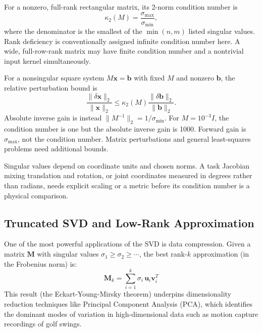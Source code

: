 For a nonzero, full-rank rectangular matrix, its 2-norm condition number is
\[
\kappa_2(M)=\frac{\sigma_{\max}}{\sigma_{\min}},
\]
where the denominator is the smallest of the $\min(n,m)$ listed singular values. Rank deficiency is conventionally assigned infinite condition number here. A wide, full-row-rank matrix may have finite condition number and a nontrivial input kernel simultaneously.

For a nonsingular square system $M\mathbf x=\mathbf b$ with fixed $M$ and nonzero $\mathbf b$, the relative perturbation bound is
\[
\frac{\|\delta\mathbf x\|_2}{\|\mathbf x\|_2}
\le \kappa_2(M)\frac{\|\delta\mathbf b\|_2}{\|\mathbf b\|_2}.
\]
Absolute inverse gain is instead $\|M^{-1}\|_2=1/\sigma_{\min}$. For $M=10^{-3}I$, the condition number is one but the absolute inverse gain is 1000. Forward gain is $\sigma_{\max}$, not the condition number. Matrix perturbations and general least-squares problems need additional bounds.

Singular values depend on coordinate units and chosen norms. A task Jacobian mixing translation and rotation, or joint coordinates measured in degrees rather than radians, needs explicit scaling or a metric before its condition number is a physical comparison.

\subsection{Truncated SVD and Low-Rank Approximation}

One of the most powerful applications of the SVD is data compression. Given a matrix $\mathbf{M}$ with singular values $\sigma_1 \geq \sigma_2 \geq \cdots$, the best rank-$k$ approximation (in the Frobenius norm) is:
\begin{equation}
    \mathbf{M}_k = \sum_{i=1}^k \sigma_i \, \mathbf{u}_i \mathbf{v}_i^T
\end{equation}
This result (the Eckart-Young-Mirsky theorem) underpins dimensionality reduction techniques like Principal Component Analysis (PCA), which identifies the dominant modes of variation in high-dimensional data such as motion capture recordings of golf swings.

